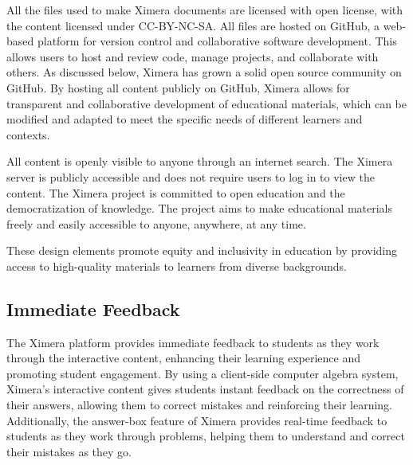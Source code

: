\documentclass{ximera}
\begin{document}
All the files used to make Ximera documents are licensed with
open license, with the content licensed under CC-BY-NC-SA.  All files
are hosted on GitHub, a web-based platform for version control and
collaborative software development.  This allows users to host and
review code, manage projects, and collaborate with others. As
discussed below, Ximera has grown a solid open source community on
GitHub. By hosting all content publicly on GitHub, Ximera allows for
transparent and collaborative development of educational materials,
which can be modified and adapted to meet the specific needs of
different learners and contexts.





All content is openly visible to anyone through an internet
search. The Ximera server is publicly accessible and does not require
users to log in to view the content. The Ximera project is committed
to open education and the democratization of knowledge. The project
aims to make educational materials freely and easily accessible to
anyone, anywhere, at any time.



These design elements promote equity and inclusivity in education by
providing access to high-quality materials to learners from diverse
backgrounds.




\subsection*{Immediate Feedback} 

The Ximera platform provides immediate feedback to students as they
work through the interactive content, enhancing their learning
experience and promoting student engagement. By using a client-side
computer algebra system, Ximera's interactive content gives students
instant feedback on the correctness of their answers, allowing them to
correct mistakes and reinforcing their learning. Additionally, the
answer-box feature of Ximera provides real-time feedback to students
as they work through problems, helping them to understand and correct
their mistakes as they go.
\end{document}
